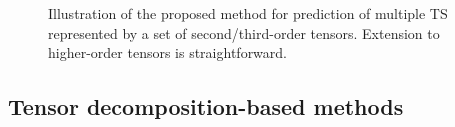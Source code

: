 \documentclass[letterpaper]{article} %
\numberwithin{theorem}{section}
\begin{document}
\begin{figure}[ttt!]
	\centering
	  \label{BHTARIMA_2Dcase}
	 \label{BHTARIMA_3Dcase}
	\caption{\label{BHTARIMAfigure}Illustration of the proposed method for prediction of multiple TS represented by a set of second/third-order tensors. Extension to higher-order tensors is straightforward.}
\end{figure}


\subsection{Tensor decomposition-based methods}
\end{document}
